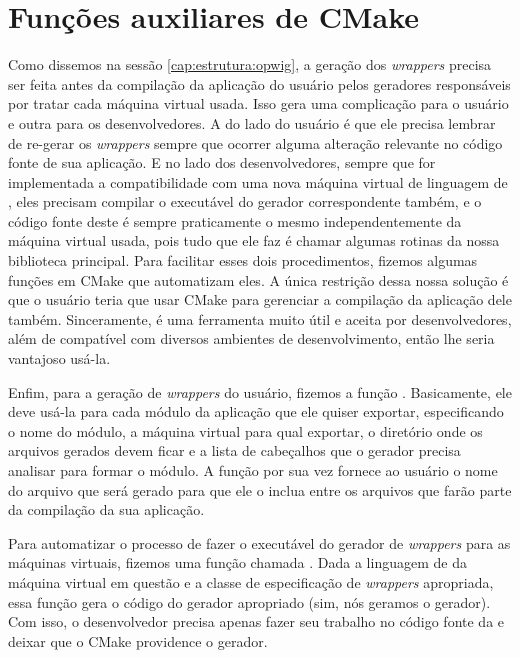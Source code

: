   \section{Funções auxiliares de CMake}
  \label{cap:atividades:cmake}
  
    Como dissemos na sessão \ref{cap:estrutura:opwig}, a geração dos
    \textit{wrappers} precisa ser feita antes da compilação da aplicação do
    usuário pelos geradores responsáveis por tratar cada máquina virtual usada.
    Isso gera uma complicação para o usuário e outra para os desenvolvedores. A
    do lado do usuário é que ele precisa lembrar de re-gerar os
    \textit{wrappers} sempre que ocorrer alguma alteração relevante no código
    fonte de sua aplicação. E no lado dos desenvolvedores, sempre que for
    implementada a compatibilidade com uma nova máquina virtual de linguagem de
    \script{}, eles precisam compilar o executável do gerador correspondente também,
    e o código fonte deste é sempre praticamente o mesmo independentemente da máquina
    virtual usada, pois tudo que ele faz é chamar algumas rotinas da nossa biblioteca
    principal. Para facilitar esses dois procedimentos, fizemos algumas funções em
    CMake que automatizam eles. A única restrição dessa nossa solução é que o usuário teria
    que usar CMake para gerenciar a compilação da aplicação dele também. Sinceramente,
    é uma ferramenta muito útil e aceita por desenvolvedores, além de compatível com
    diversos ambientes de desenvolvimento, então lhe seria vantajoso usá-la.
    
    Enfim, para a geração de \textit{wrappers} do usuário, fizemos a função
    . Basicamente, ele deve usá-la para cada módulo
    da aplicação que ele quiser exportar, especificando o nome do módulo, a
    máquina virtual para qual exportar, o diretório onde os arquivos gerados
    devem ficar e a lista de cabeçalhos que o gerador precisa analisar para formar
    o módulo. A função por sua vez fornece ao usuário o nome do arquivo que
    será gerado para que ele o inclua entre os arquivos que farão parte da
    compilação da sua aplicação.

    Para automatizar o processo de fazer o executável do gerador de
    \textit{wrappers} para as máquinas virtuais, fizemos uma função chamada
    . Dada a linguagem de \script{} da
    máquina virtual em questão e a classe de especificação de \textit{wrappers}
    apropriada, essa função gera o código do gerador apropriado (sim, nós geramos o
    gerador). Com isso, o desenvolvedor precisa apenas fazer seu trabalho no
    código fonte da  e deixar que o CMake providence o
    gerador.


